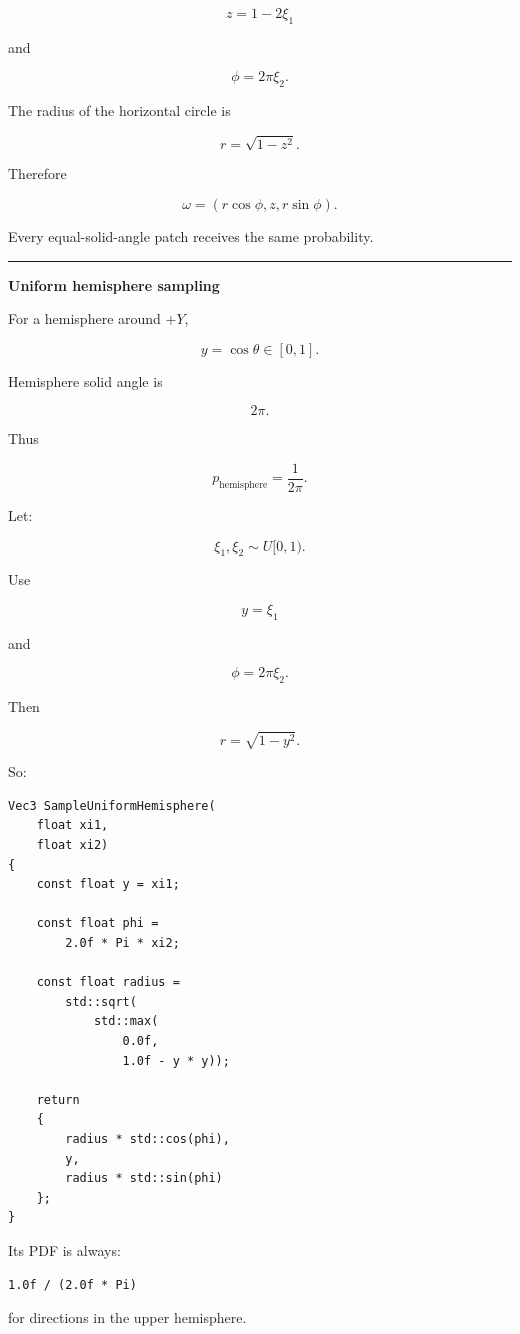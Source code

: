 \[
\boxed{
z=1-2\xi_1
}
\]

and

\[
\boxed{
\phi=2\pi\xi_2.
}
\]

The radius of the horizontal circle is

\[
r=\sqrt{1-z^2}.
\]

Therefore

\[
\boxed{
\omega=
\left(
r\cos\phi,
z,
r\sin\phi
\right).
}
\]

Every equal-solid-angle patch receives the same probability.

\begin{center}\rule{0.5\linewidth}{0.5pt}\end{center}

\textbf{Uniform hemisphere sampling}

For a hemisphere around \(+Y\),

\[
y=\cos\theta\in[0,1].
\]

Hemisphere solid angle is

\[
2\pi.
\]

Thus

\[
\boxed{
p_{\text{hemisphere}}
=
\frac{1}{2\pi}.
}
\]

Let:

\[
\xi_1,\xi_2\sim U[0,1).
\]

Use

\[
\boxed{
y=\xi_1
}
\]

and

\[
\phi=2\pi\xi_2.
\]

Then

\[
r=\sqrt{1-y^2}.
\]

So:

\begin{verbatim}
Vec3 SampleUniformHemisphere(
    float xi1,
    float xi2)
{
    const float y = xi1;

    const float phi =
        2.0f * Pi * xi2;

    const float radius =
        std::sqrt(
            std::max(
                0.0f,
                1.0f - y * y));

    return
    {
        radius * std::cos(phi),
        y,
        radius * std::sin(phi)
    };
}
\end{verbatim}

Its PDF is always:

\begin{verbatim}
1.0f / (2.0f * Pi)
\end{verbatim}

for directions in the upper hemisphere.

